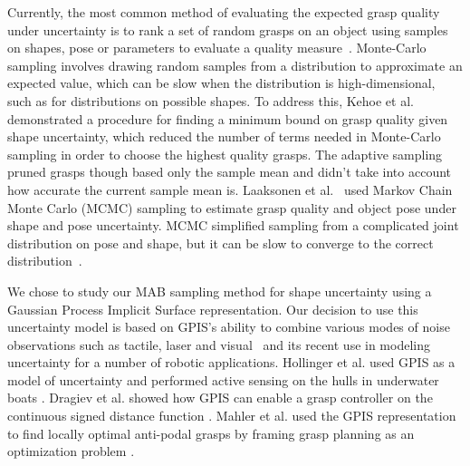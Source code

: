 \documentclass[letterpaper, 10 pt, conference]{ieeeconf}  %
\begin{document}
Currently, the most common method of evaluating the expected grasp quality under uncertainty is to rank a set of random grasps on an object using  samples on shapes, pose or parameters to evaluate a quality measure~\cite{christopoulos2007handling, kehoe2012estimating, kehoe2012toward}.
Monte-Carlo sampling involves drawing random samples from a distribution to approximate an expected value\cite{caflisch1998monte}, which can be slow when the distribution is high-dimensional, such as for distributions on possible shapes.
To address this, Kehoe et al.~\cite{kehoe2012estimating} demonstrated a procedure for finding a minimum bound on grasp quality given shape uncertainty, which reduced the number of terms needed in Monte-Carlo sampling in order to choose the highest quality grasps. The adaptive sampling pruned grasps  though based only the sample mean and didn't take into account how accurate the current sample mean is. 
Laaksonen et al.~\cite{laaksonen2012probabilistic} used Markov Chain Monte Carlo (MCMC) sampling to estimate grasp quality and object pose  under shape and pose uncertainty.
MCMC simplified sampling from a complicated joint distribution on pose and shape, but it can be slow to converge to the correct distribution~\cite{andrieu2003introduction}.

We chose to study our MAB sampling method for shape uncertainty using a Gaussian Process Implicit Surface representation. Our decision to use this uncertainty model is based on GPIS's ability to combine various modes of noise observations such as tactile, laser and visual~\cite{rasmussen2006, williams2007, dragiev2011} and its recent use in modeling uncertainty for a number of robotic applications.
Hollinger et al. used GPIS as a model of uncertainty and performed active sensing on the hulls in underwater boats \cite{hollinger2013}.
Dragiev et al. showed how GPIS can enable a grasp controller on the continuous signed distance function \cite{dragiev2011}.
Mahler et al. used the GPIS representation to find locally optimal anti-podal grasps by framing grasp planning as an optimization problem \cite{mahler2015opt}. 
\end{document}
